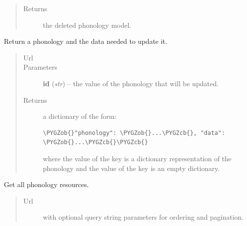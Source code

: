 \documentclass[letterpaper,10pt,english]{sphinxmanual}
\def\PYGZob{\char`\{}
\def\PYGZcb{\char`\}}
\begin{document}
\begin{fulllineitems}
\begin{fulllineitems}
\begin{quote}
\begin{description}
\item[{Returns}] \leavevmode
the deleted phonology model.

\end{description}\end{quote}

\end{fulllineitems}


\begin{fulllineitems}
\label{api:onlinelinguisticdatabase.controllers.phonologies.PhonologiesController.edit}
Return a phonology and the data needed to update it.
\begin{quote}\begin{description}
\item[{Url }] \leavevmode
{}

\item[{Parameters}] \leavevmode
\textbf{id} (\emph{str}) -- the  value of the phonology that will be updated.

\item[{Returns}] \leavevmode

a dictionary of the form:

\begin{Verbatim}[commandchars=\\\{\}]
\PYGZob{}"phonology": \PYGZob{}...\PYGZcb{}, "data": \PYGZob{}...\PYGZcb{}\PYGZcb{}
\end{Verbatim}

where the value of the  key is a dictionary
representation of the phonology and the value of the  key
is an empty dictionary.


\end{description}\end{quote}

\end{fulllineitems}


\begin{fulllineitems}
\label{api:onlinelinguisticdatabase.controllers.phonologies.PhonologiesController.index}
Get all phonology resources.
\begin{quote}\begin{description}
\item[{Url }] \leavevmode
{} with optional query string parameters for
ordering and pagination.


\end{description}
\end{quote}
\end{fulllineitems}
\end{fulllineitems}
\end{document}
